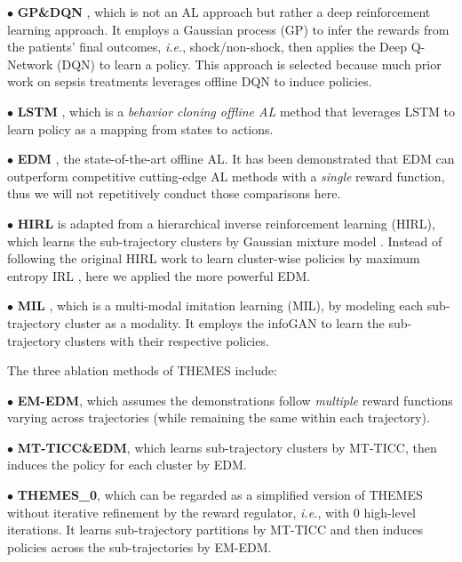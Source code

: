 \documentclass{article}
\begin{document}
\noindent $\bullet$ \textbf{GP\&DQN} \cite{azizsoltani2019unobserved}, which is not an AL approach but rather a deep reinforcement learning approach. It employs a Gaussian process (GP) to infer the rewards from the patients' final outcomes, \textit{i.e.}, shock/non-shock, then applies the Deep Q-Network (DQN) \cite{fan2020theoretical} to learn a policy. This approach is selected because much prior work on sepsis treatments leverages offline DQN to induce policies. 

\noindent $\bullet$ \textbf{LSTM} \cite{duan2017one}, which is a \emph{behavior cloning offline AL} method that leverages LSTM to learn policy as a mapping from states to actions.

\noindent $\bullet$ \textbf{EDM} \cite{jarrett2020strictly}, the state-of-the-art offline AL. It has been demonstrated that EDM can outperform competitive cutting-edge AL methods with a \emph{single} reward function, thus we will not repetitively conduct those comparisons here. 

\noindent $\bullet$ \textbf{HIRL} \cite{krishnan2016hirl} is adapted from a hierarchical inverse reinforcement learning (HIRL), which learns the sub-trajectory clusters by Gaussian mixture model \cite{reynolds2009gaussian}. Instead of following the original HIRL work to learn cluster-wise policies by maximum entropy IRL \cite{ziebart2008maximum}, here we applied the more powerful EDM. 



\noindent $\bullet$ \textbf{MIL} \cite{hausman2017multi}, which is a multi-modal imitation learning (MIL), by modeling each sub-trajectory cluster as a modality. It employs the infoGAN \cite{chen2016infogan} to learn the sub-trajectory clusters with their respective policies.


\noindent The three ablation methods of THEMES include: 

\noindent $\bullet$ \textbf{EM-EDM}, which assumes the demonstrations follow \emph{multiple} reward functions varying across trajectories (while remaining the same within each trajectory). 

\noindent $\bullet$ \textbf{MT-TICC\&EDM}, which learns sub-trajectory clusters by MT-TICC, then induces the policy for each cluster by EDM. 

\noindent $\bullet$ \textbf{THEMES\_0}, which can be regarded as a simplified version of THEMES without iterative refinement by the reward regulator, \textit{i.e.}, with 0 high-level iterations. It learns sub-trajectory partitions by MT-TICC and then induces policies across the sub-trajectories by EM-EDM. 
\end{document}

